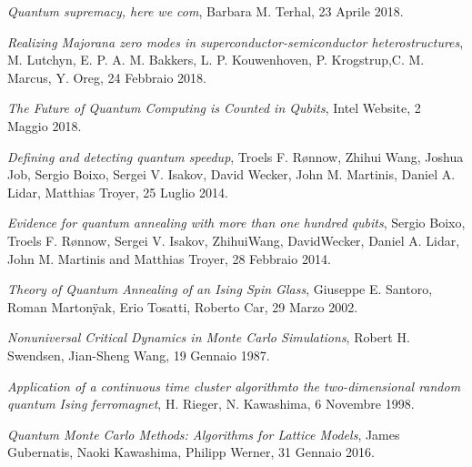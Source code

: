 \begin{thebibliography}{99}
    \textit{Quantum supremacy, here we com},
    Barbara M. Terhal,
    23 Aprile 2018.

    \textit{Realizing Majorana zero modes in superconductor-semiconductor heterostructures},
    M. Lutchyn, E. P. A. M. Bakkers, L. P. Kouwenhoven, P. Krogstrup,C. M. Marcus, Y. Oreg,
    24 Febbraio 2018.

    \textit{The Future of Quantum Computing is Counted in Qubits},
    Intel Website,
    2 Maggio 2018.

    \textit{Defining and detecting quantum speedup},
    Troels F. Rønnow, Zhihui Wang, Joshua Job, Sergio Boixo, Sergei V. Isakov, David Wecker, John M. Martinis, Daniel A. Lidar, Matthias Troyer,
    25 Luglio 2014.

    \textit{Evidence for quantum annealing with more than
one hundred qubits},
    Sergio Boixo, Troels F. Rønnow, Sergei V. Isakov, ZhihuiWang, DavidWecker, Daniel A. Lidar, John M. Martinis and Matthias Troyer,
    28 Febbraio 2014.

    \textit{Theory of Quantum Annealing of an Ising Spin Glass},
    Giuseppe E. Santoro, Roman Martonÿak, Erio Tosatti, Roberto Car,
    29 Marzo 2002.

    \textit{Nonuniversal Critical Dynamics in Monte Carlo Simulations},
    Robert H. Swendsen, Jian-Sheng Wang,
    19 Gennaio 1987.

    \textit{Application of a continuous time cluster algorithmto the two-dimensional random quantum Ising ferromagnet},
    H. Rieger, N. Kawashima,
    6 Novembre 1998.

    \textit{Quantum Monte Carlo Methods: Algorithms for Lattice Models},
    James Gubernatis, Naoki Kawashima, Philipp Werner,
    31 Gennaio 2016.

\end{thebibliography}
